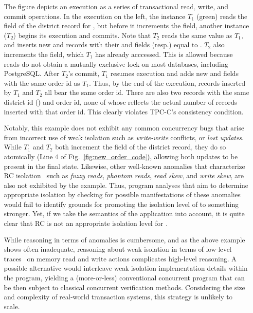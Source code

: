 The figure depicts an execution as a series of transactional read, write, and commit
operations. In the execution on the left, the  instance
$T_1$ (green) reads the  field of the district
record for , but before it increments the field, another
 instance ($T_2$) begins its execution and commits. Note
that $T_2$ reads the same  value as $T_1$, and
inserts new  and  records with their 
and  fields (resp.) equal to . $T_2$
also increments the  field, which $T_1$ has already
acccessed. This is allowed because reads do not obtain a mutually
exclusive lock on most databases, including PostgreSQL. After $T_2$'s
commit, $T_1$ resumes execution and adds new  and
 fields with the same order id as $T_1$. Thus, by the
end of the execution,  records inserted by $T_1$ and
$T_2$ all bear the same order id. There are also two  records
with the same district id () and order id, none of whose
 reflects the actual number of  records
inserted with that order id.  This clearly violates TPC-C's consistency
condition.

Notably, this example does not exhibit any common concurrency bugs
that arise from incorrect use of weak isolation such as
\emph{write-write} conflicts, or \emph{lost updates}.  While $T_1$ and
$T_2$ both increment the  field of the district
record, they do so atomically (Line 4 of
Fig.~\ref{fig:new_order_code}), allowing both updates to be present in
the final state. Likewise, other well-known anomalies that
characterize RC isolation~\cite{berenson} such as \emph{fuzzy reads},
\emph{phantom reads}, \emph{read skew}, and \emph{write skew}, are
also not exhibited by the example.  Thus, program analyses that aim to
determine appropriate isolation by checking for possible
manifestations of these anomalies would fail to identify grounds for
promoting the isolation level of  to something stronger.
Yet, if we take the semantics of the application into account, it is
quite clear that RC is not an appropriate isolation level for
.

While reasoning in terms of anomalies is cumbersome, and as the above
example shows often inadequate, reasoning about weak isolation in
terms of low-level traces~\cite{adyaphd,gotsmanconcur15} on memory
read and write actions complicates high-level reasoning.  A possible
alternative would interleave weak isolation implementation details
within the program, yielding a (more-or-less) conventional concurrent
program that can be then subject to classical concurrent verification
methods.  Considering the size and complexity of real-world
transaction systems, this strategy is unlikely to scale.

